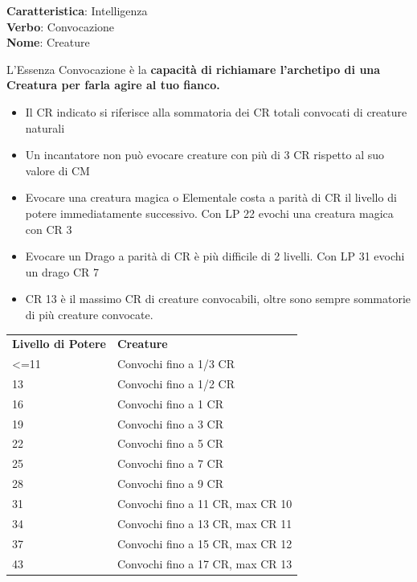 \documentclass[a4paper,10 pt,twoside,openany]{book}
\begin{document}
\textbf{Caratteristica}: Intelligenza\\
\textbf{Verbo}: Convocazione\\
\textbf{Nome}: Creature\\

\label{essenza-convocazione---intelletto}

L'Essenza Convocazione è la \textbf{capacità di richiamare l'archetipo di una Creatura per farla agire al tuo fianco.}
\begin{itemize}
	\item
	Il CR indicato si riferisce alla sommatoria dei CR totali convocati di creature naturali
	\item
	Un incantatore non può evocare creature con più di 3 CR rispetto al suo valore di CM
	\item
	Evocare una creatura magica o Elementale costa a parità di CR il livello di potere immediatamente successivo. Con LP 22 evochi una creatura magica con CR 3
	\item
	Evocare un Drago a parità di CR è più difficile di 2 livelli. Con LP 31 evochi un drago CR 7
	\item
	CR 13 è il massimo CR di creature convocabili, oltre sono sempre sommatorie di più creature convocate.
\end{itemize}

\bigskip

\begin{tabular}{ll}
	\toprule
	\textbf{Livello di Potere} & \textbf{Creature}\\
	\textless=11               & Convochi fino a 1/3 CR\\
	13                         & Convochi fino a 1/2 CR\\
	16                         & Convochi fino a 1 CR\\
	19                         & Convochi fino a 3 CR\\
	22                         & Convochi fino a 5 CR\\
	25                         & Convochi fino a 7 CR\\
	28                         & Convochi fino a 9 CR\\
	31                         & Convochi fino a 11 CR, max CR 10\\
	34                         & Convochi fino a 13 CR, max CR 11\\
	37                         & Convochi fino a 15 CR, max CR 12\\
	43                         & Convochi fino a 17 CR, max CR 13\\
\end{tabular}
\end{document}
